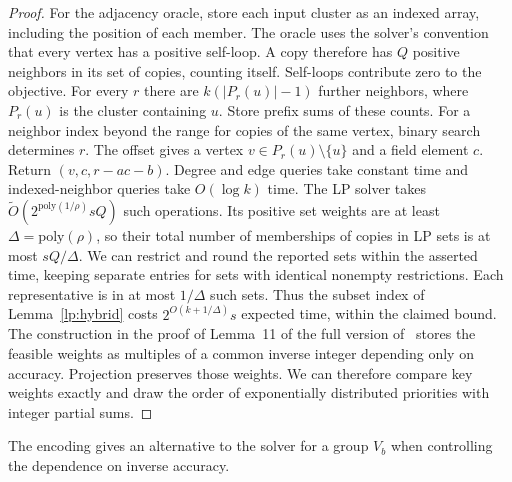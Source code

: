\documentclass[11pt]{article}
\begin{document}
\begin{proof}
For the adjacency oracle, store each input cluster as an indexed array,
including the position of each member. The oracle uses the solver's convention that
every vertex has a positive self-loop. A copy
therefore has $Q$ positive neighbors in its set of copies, counting itself.
Self-loops contribute zero to the objective. For every $r$ there are
$k(|P_r(u)|-1)$ further neighbors, where $P_r(u)$ is the cluster
containing $u$. Store prefix sums of these counts. For a neighbor
index beyond the range for copies of the same vertex, binary search determines $r$.
The offset gives a vertex $v\in P_r(u)\setminus\{u\}$ and a field
element $c$. Return $(v,c,r-ac-b)$. Degree and edge queries take
constant time and indexed-neighbor queries take $O(\log k)$ time.
The LP solver takes $\widetilde O(2^{\mathrm{poly}(1/\rho)}sQ)$
such operations. Its positive set weights are at least
$\Delta=\mathrm{poly}(\rho)$, so their total number of memberships of copies
in LP sets is at most $sQ/\Delta$. We can restrict and round the
reported sets within the asserted time, keeping separate entries for
sets with identical nonempty restrictions. Each representative is in at
most $1/\Delta$ such sets. Thus the subset index of Lemma~\ref{lp:hybrid}
costs $2^{O(k+1/\Delta)}s$ expected time, within the claimed bound.
The construction in the proof of Lemma~11 of the full version
of~\cite{clusterLP25} stores the feasible weights as multiples of a common
inverse integer depending only on accuracy. Projection preserves those
weights. We can therefore compare key weights exactly and draw the
order of exponentially distributed priorities with integer partial sums.
\end{proof}

The encoding gives an alternative to the solver for a group $V_b$ when
controlling the dependence on inverse accuracy.
\end{document}
